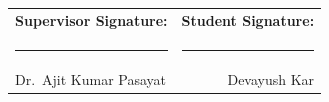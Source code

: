 \documentclass[12pt,a4paper]{report}
\begin{document}
\vspace{2cm}
\noindent
\begin{tabular*}{\textwidth}{@{\extracolsep{\fill}}lr}
	\textbf{Supervisor Signature:} & \textbf{Student Signature:} \\[1.8cm]
	\rule{6cm}{0.4pt} & \rule{6cm}{0.4pt} \\
	Dr.\ Ajit Kumar Pasayat & Devayush Kar \\
\end{tabular*}

\titleformat{\chapter}[display]
{\normalfont\huge\bfseries}{\chaptertitlename\ \thechapter}{20pt}{\Huge}

\clearpage
{}

\end{document}
